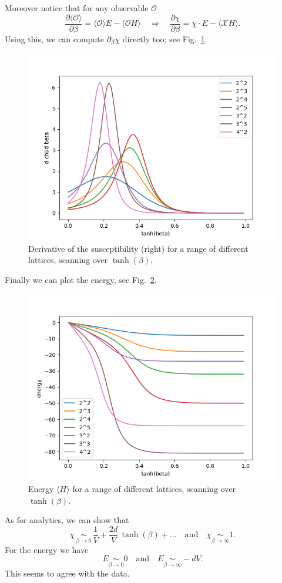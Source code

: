 \documentclass[10pt,letterpaper]{article}
\def\Oo{\mathcal{O}}
\def\pd{\partial}
\newcommand\beq{\begin{equation}}
\newcommand\eeq{\end{equation}}
\newcommand{\expec}[1]{\langle #1 \rangle}
\newcommand{\limu}[1]{\mathrel{\mathop{\sim}\limits_{\scriptstyle{#1}}}}
\def\mca{\mathcal}
\def\qaq{\quad\text{and}\quad}
\begin{document}
Moreover notice that for any observable $\Oo$
\beq
\frac{\pd \expec{\Oo}}{\pd \beta} = \expec{\Oo} E -  \expec{\Oo H}
\quad
\Rightarrow
\quad
\frac{\pd\chi}{\pd\beta} = \chi \cdot E - \expec{\mca{X} H}.
\eeq
Using this, we can compute $\pd_\beta \chi$ directly too; see Fig.~\ref{fig:ds}.
\begin{figure}[htb]
  \begin{center}
    \includegraphics[scale=.5]{der_suscepPlot.png}
    \caption{\label{fig:ds}Derivative of the
      susceptibility (right) for a range of different lattices,
      scanning over $\tanh(\beta)$.}
  \end{center}
\end{figure}
Finally we can plot the energy, see Fig.~\ref{fig:en}.
\begin{figure}[htb]
  \begin{center}
    \hspace{0mm}
    \includegraphics[scale=.5]{energyPlot.png}
    \caption{\label{fig:en}Energy $\expec{H}$ for a range of different lattices,
      scanning over $\tanh(\beta)$.}
  \end{center}
\end{figure}

As for analytics, we can show that
\beq
\chi \, \limu{\beta \to 0} \,  \frac{1}{V} + \frac{2d}{V}\, \tanh(\beta) + \ldots
\qaq
\chi \limu{\beta \to \infty} 1.
\eeq
For the energy we have
\beq
E \limu{\beta \to 0} 0 \qaq
E \limu{\beta \to \infty} -dV.
\eeq
This seems to agree with the data.

   
\end{document}
